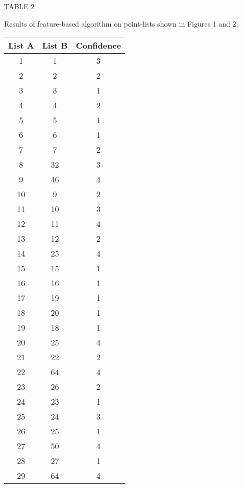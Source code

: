 \begin{center}

TABLE 2

\smallskip

Results of feature-based algorithm on point-lists shown in Figures 
1 and 2.

\bigskip

\bigskip

\bigskip

\begin{tabular}{c c c} \hline
List A  & List B & Confidence \\ \hline
       1 &      1   &    3  \\  
       2 &      2   &    2  \\  
       3 &      3   &    1  \\  
       4 &      4   &    2  \\  
       5 &      5   &    1  \\   
       6 &      6   &    1  \\   
       7 &      7   &    2  \\
       8 &     32   &    3  \\
       9 &     46   &    4   \\
      10 &      9   &    2  \\
      11 &     10   &    3   \\
      12 &     11   &    4  \\
      13 &     12   &   2    \\
      14 &     25   &    4   \\
      15 &     15   &    1    \\
      16 &     16   &    1  \\
      17 &     19   &    1    \\
      18 &     20   &    1    \\
      19 &     18   &    1    \\
      20 &     25   &    4   \\
      21 &     22   &    2    \\
      22 &     64   &    4    \\
      23 &     26   &    2   \\
      24 &     23   &    1   \\
      25 &     24   &    3   \\
      26 &     25   &    1   \\
      27 &     50   &    4   \\
      28 &     27   &    1   \\
      29 &     64   &    4    \\ \hline
\end{tabular}
\end{center}

